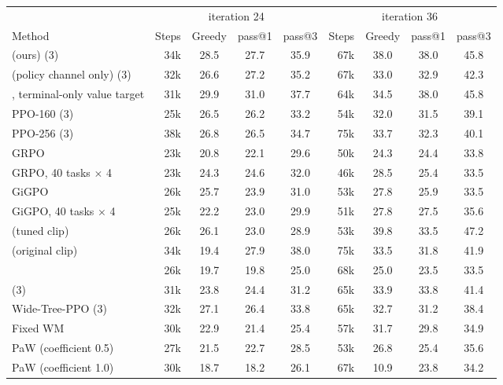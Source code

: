 \begin{tabular}{l r c c c r c c c }
\toprule
 & \multicolumn{4}{c}{iteration 24} & \multicolumn{4}{c}{iteration 36} \\
\cmidrule(lr){2-5}\cmidrule(lr){6-9}
Method & Steps & Greedy & pass@1 & pass@3 & Steps & Greedy & pass@1 & pass@3 \\
\midrule
\wmppo{} (ours) (3) & 34k & 28.5 & 27.7 & 35.9 & 67k & 38.0 & 38.0 & 45.8 \\
\wmppo{} (policy channel only) (3) & 32k & 26.6 & 27.2 & 35.2 & 67k & 33.0\sigup{} & 32.9\sigup{} & 42.3 \\
\wmppo{}, terminal-only value target & 31k & 29.9 & 31.0\sigdn{} & 37.7 & 64k & 34.5\sigup{} & 38.0 & 45.8 \\
PPO-160 (3) & 25k & 26.5 & 26.2\sigup{} & 33.2 & 54k & 32.0\sigup{} & 31.5\sigup{} & 39.1 \\
PPO-256 (3) & 38k & 26.8 & 26.5 & 34.7 & 75k & 33.7\sigup{} & 32.3\sigup{} & 40.1 \\
GRPO & 23k & 20.8\sigup{} & 22.1\sigup{} & 29.6 & 50k & 24.3\sigup{} & 24.4\sigup{} & 33.8 \\
GRPO, 40 tasks $\times$ 4 & 23k & 24.3\sigup{} & 24.6\sigup{} & 32.0 & 46k & 28.5\sigup{} & 25.4\sigup{} & 33.5 \\
GiGPO & 26k & 25.7 & 23.9\sigup{} & 31.0 & 53k & 27.8\sigup{} & 25.9\sigup{} & 33.5 \\
GiGPO, 40 tasks $\times$ 4 & 25k & 22.2\sigup{} & 23.0\sigup{} & 29.9 & 51k & 27.8\sigup{} & 27.5\sigup{} & 35.6 \\
\sopo{} (tuned clip) & 26k & 26.1 & 23.0\sigup{} & 28.9 & 53k & 39.8 & 33.5\sigup{} & 47.2 \\
\sopo{} (original clip) & 34k & 19.4\sigup{} & 27.9 & 38.0 & 75k & 33.5 & 31.8\sigup{} & 41.9 \\
\steppo{} & 26k & 19.7\sigup{} & 19.8\sigup{} & 25.0 & 68k & 25.0\sigup{} & 23.5\sigup{} & 33.5 \\
\qppo{} (3) & 31k & 23.8\sigup{} & 24.4\sigup{} & 31.2 & 65k & 33.9\sigup{} & 33.8\sigup{} & 41.4 \\
Wide-Tree-PPO (3) & 32k & 27.1 & 26.4 & 33.8 & 65k & 32.7\sigup{} & 31.2\sigup{} & 38.4 \\
Fixed WM & 30k & 22.9\sigup{} & 21.4\sigup{} & 25.4 & 57k & 31.7\sigup{} & 29.8\sigup{} & 34.9 \\
PaW (coefficient 0.5) & 27k & 21.5\sigup{} & 22.7\sigup{} & 28.5 & 53k & 26.8\sigup{} & 25.4\sigup{} & 35.6 \\
PaW (coefficient 1.0) & 30k & 18.7\sigup{} & 18.2\sigup{} & 26.1 & 67k & 10.9\sigup{} & 23.8\sigup{} & 34.2 \\

\end{tabular}
